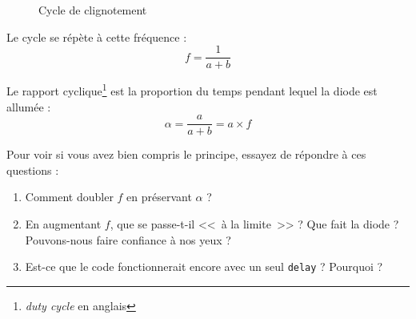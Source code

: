 \documentclass[11pt,a4paper,oneside,twocolumn]{article}
\begin{document}
\begin{figure}[ht]
	\centering
	\caption{Cycle de clignotement}
	\label{fig:slice}
\end{figure}

Le cycle se répète à cette fréquence :
\begin{equation}
	f=\frac1{a+b}
\end{equation}

Le rapport cyclique\footnote{\emph{duty cycle} en anglais} est la proportion du
temps pendant lequel la diode est allumée :
\begin{equation}
	\alpha=\frac a{a+b}=a\times f
\end{equation}

Pour voir si vous avez bien compris le principe, essayez de répondre à ces
questions :
\begin{enumerate}
\item Comment doubler $f$ en préservant $\alpha$ ?
\item En augmentant $f$, que se passe-t-il <<~à la limite~>> ? Que fait la
	diode ? Pouvons-nous faire confiance à nos yeux ?
\item Est-ce que le code fonctionnerait encore avec un seul \texttt{delay} ?
	Pourquoi ?
\end{enumerate}
\end{document}
